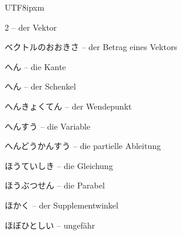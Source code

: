 \begin{CJK}{UTF8}{ipxm}
\begin{multicols}{2}
 -- der Vektor\dotfill\hyperref[e:301]{\pageref*{e:301}}\par
{} {\footnotesize\color{black!70}ベクトルのおおきさ} -- der Betrag eines Vektors\dotfill\hyperref[e:305]{\pageref*{e:305}}\par
{} {\footnotesize\color{black!70}へん} -- die Kante\dotfill\hyperref[e:246]{\pageref*{e:246}}\par
{} {\footnotesize\color{black!70}へん} -- der Schenkel\dotfill\hyperref[e:155]{\pageref*{e:155}}\par
{} {\footnotesize\color{black!70}へんきょくてん} -- der Wendepunkt\dotfill\hyperref[e:284]{\pageref*{e:284}}\par
{} {\footnotesize\color{black!70}へんすう} -- die Variable\dotfill\hyperref[e:71]{\pageref*{e:71}}\par
{} {\footnotesize\color{black!70}へんどうかんすう} -- die partielle Ableitung\dotfill\hyperref[e:277]{\pageref*{e:277}}\par
{} {\footnotesize\color{black!70}ほうていしき} -- die Gleichung\dotfill\hyperref[e:76]{\pageref*{e:76}}\par
{} {\footnotesize\color{black!70}ほうぶつせん} -- die Parabel\dotfill\hyperref[e:125]{\pageref*{e:125}}\par
{} {\footnotesize\color{black!70}ほかく} -- der Supplementwinkel\dotfill\hyperref[e:165]{\pageref*{e:165}}\par
{} {\footnotesize\color{black!70}ほぼひとしい} -- ungefähr\dotfill\hyperref[e:69]{\pageref*{e:69}}\par


\end{multicols}
\end{CJK}
